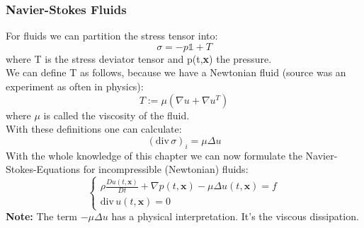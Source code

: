 \documentclass[12pt,a4paper]{report}
\begin{document}
\subsubsection{Navier-Stokes Fluids}
For fluids we can partition the stress tensor into:
\begin{equation}
    \sigma = -p\mathbb{1} + T
\end{equation}
where T is the stress deviator tensor and p(t,\textbf{x}) the pressure.\\
We can define T as follows, because we have a Newtonian fluid (source was an experiment as often in physics):
\begin{equation}
    T := \mu (\nabla u + \nabla u^T)
\end{equation}
where \(\mu\) is called the viscosity of the fluid.\\
With these definitions one can calculate:
\begin{equation}
    (\text{div} \,\sigma)_i = \mu \Delta u
\end{equation}
With the whole knowledge of this chapter we can now formulate the Navier-Stokes-Equations for incompressible (Newtonian) fluids:
\begin{equation}
\begin{cases}
\rho \frac{Du(t,\textbf{x})}{Dt} + \nabla p(t,\textbf{x}) - \mu \Delta u(t,\textbf{x}) = f \\
\text{div}\, u(t,\textbf{x}) = 0
\end{cases}
\end{equation}
\textbf{Note:} The term \(-\mu \Delta u\) has a physical interpretation. It's the viscous dissipation.
\newpage
\end{document}
